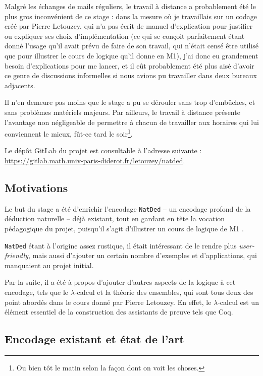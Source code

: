 \documentclass[a4paper]{article}
\begin{document}
Malgré les échanges de mails réguliers, le travail à distance a probablement été le plus gros inconvénient de ce stage : dans la mesure où je travaillais sur un codage créé par Pierre Letouzey, qui n'a pas écrit de manuel d'explication pour justifier ou expliquer ses choix d'implémentation (ce qui se conçoit parfaitement étant donné l'usage qu'il avait prévu de faire de son travail, qui n'était censé être utilisé que pour illustrer le cours de logique qu'il donne en M1), j'ai donc eu grandement besoin d'explications pour me lancer, et il eût probablement été plus aisé d'avoir ce genre de discussions informelles si nous avions pu travailler dans deux bureaux adjacents.

Il n'en demeure pas moins que le stage a pu se dérouler sans trop d'embûches, et sans problèmes matériels majeurs. Par ailleurs, le travail à distance présente l'avantage non négligeable de permettre à chacun de travailler aux horaires qui lui conviennent le mieux, fût-ce tard le soir\footnote{Ou bien tôt le matin selon la façon dont on voit les choses.}.

Le dépôt GitLab du projet est consultable à l'adresse suivante : \url{https://gitlab.math.univ-paris-diderot.fr/letouzey/natded}.

\subsection*{Motivations}

Le but du stage a été d'enrichir l'encodage \verb+NatDed+ -- un encodage profond de la déduction naturelle -- déjà existant, tout en gardant en tête la vocation pédagogique du projet, puisqu'il s'agit d'illustrer un cours de logique de M1 \cite{poly}.

\verb+NatDed+ étant à l'origine assez rustique, il était intéressant de le rendre plus \textit{user-friendly}, mais aussi d'ajouter un certain nombre d'exemples et d'applications, qui manquaient au projet initial.

Par la suite, il a été à propos d'ajouter d'autres aspects de la logique à cet encodage, tels que le $\lambda$-calcul et la théorie des ensembles, qui sont tous deux des point abordés dans le cours donné par Pierre Letouzey. En effet, le $\lambda$-calcul est un élément essentiel de la construction des assistants de preuve tels que Coq.

\subsection*{Encodage existant et état de l'art}
\end{document}
